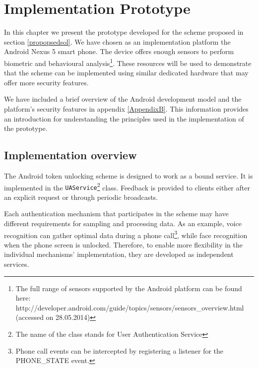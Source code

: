 
\chapter{Implementation Prototype} %

\label{Chapter5} %

In this chapter we present the prototype developed for the scheme proposed in section \ref{propopsedsol}. We have chosen as an implementation platform the Android Nexus 5 smart phone. The device offers enough sensors to perform biometric and behavioural analysis\footnote{The full range of sensors supported by the Android platform can be found here: http://developer.android.com/guide/topics/sensors/sensors\_overview.html (accessed on 28.05.2014)}. These resources will be used to demonstrate that the scheme can be implemented using similar dedicated hardware that may offer more security features.

We have included a brief overview of the Android development model and the platform's security features in appendix \ref{AppendixB}. This information provides an introduction for understanding the principles used in the implementation of the prototype.

\section{Implementation overview}
\label{impleoverview}
The Android token unlocking scheme is designed to work as a bound service. It is implemented in the {\tt UAService}\footnote{The name of the class stands for User Authentication Service} class. Feedback is provided to clients either after an explicit request or through periodic broadcasts.

Each authentication mechanism that participates in the scheme may have different requirements for sampling and processing data. As an example, voice recognition can gather optimal data during a phone call\footnote{Phone call events can be intercepted by registering a listener for the PHONE\_STATE event.}, while face recognition when the phone screen is unlocked. Therefore, to enable more flexibility in the individual mechanisms' implementation, they are developed as independent services.

